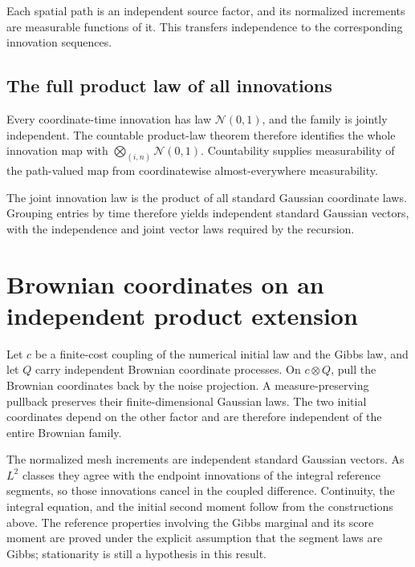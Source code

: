 \documentclass[11pt,a4paper]{article}
\begin{document}
Each spatial path is an independent source factor, and its normalized increments are measurable functions of it. This transfers independence to the corresponding innovation sequences.


\subsection{\texorpdfstring{The full product law of all innovations}{The full product law of all innovations}}


Every coordinate-time innovation has law \(\mathcal N(0,1)\), and the family is jointly independent. The countable product-law theorem therefore identifies the whole innovation map with \(\bigotimes_{(i,n)}\mathcal N(0,1)\). Countability supplies measurability of the path-valued map from coordinatewise almost-everywhere measurability.



The joint innovation law is the product of all standard Gaussian coordinate laws. Grouping entries by time therefore yields independent standard Gaussian vectors, with the independence and joint vector laws required by the recursion.


\section{\texorpdfstring{Brownian coordinates on an independent product extension}{Brownian coordinates on an independent product extension}}


Let \(c\) be a finite-cost coupling of the numerical initial law and the Gibbs law, and let \(Q\) carry independent Brownian coordinate processes. On \(c\otimes Q\), pull the Brownian coordinates back by the noise projection. A measure-preserving pullback preserves their finite-dimensional Gaussian laws. The two initial coordinates depend on the other factor and are therefore independent of the entire Brownian family.



The normalized mesh increments are independent standard Gaussian vectors. As \(L^2\) classes they agree with the endpoint innovations of the integral reference segments, so those innovations cancel in the coupled difference. Continuity, the integral equation, and the initial second moment follow from the constructions above. The reference properties involving the Gibbs marginal and its score moment are proved under the explicit assumption that the segment laws are Gibbs; stationarity is still a hypothesis in this result.
\end{document}
